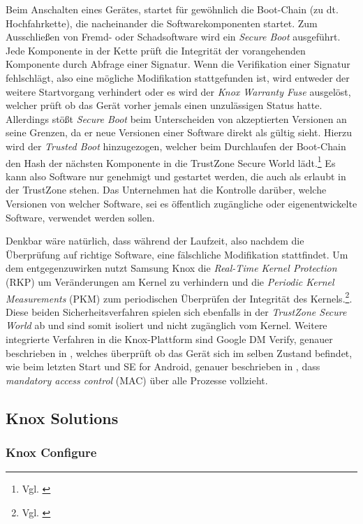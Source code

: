 Beim Anschalten eines Gerätes, startet für gewöhnlich die Boot-Chain (zu dt. Hochfahrkette), die nacheinander die Softwarekomponenten startet. Zum Ausschließen von Fremd- oder Schadsoftware wird ein \textit{Secure Boot} ausgeführt. Jede Komponente in der Kette prüft die Integrität der vorangehenden Komponente durch Abfrage einer Signatur. Wenn die Verifikation einer Signatur fehlschlägt, also eine mögliche Modifikation stattgefunden ist, wird entweder der weitere Startvorgang verhindert oder es wird der \textit{Knox Warranty Fuse} ausgelöst, welcher prüft ob das Gerät vorher jemals einen unzulässigen Status hatte. Allerdings stößt \textit{Secure Boot} beim Unterscheiden von akzeptierten Versionen an seine Grenzen, da er neue Versionen einer Software direkt als gültig sieht. Hierzu wird der \textit{Trusted Boot} hinzugezogen, welcher beim Durchlaufen der Boot-Chain den Hash der nächsten Komponente in die TrustZone Secure World lädt.\footnote{Vgl. \cite{sam2017d} } Es kann also Software nur genehmigt und gestartet werden, die auch als erlaubt in der TrustZone stehen. Das Unternehmen hat die Kontrolle darüber, welche Versionen von welcher Software, sei es öffentlich zugängliche oder eigenentwickelte Software, verwendet werden sollen. 

Denkbar wäre natürlich, dass während der Laufzeit, also nachdem die Überprüfung auf richtige Software, eine fälschliche Modifikation stattfindet. Um dem entgegenzuwirken nutzt Samsung Knox die \textit{Real-Time Kernel Protection} (RKP) um Veränderungen am Kernel zu verhindern und die \textit{Periodic Kernel Measurements} (PKM) zum periodischen Überprüfen der Integrität des Kernels.\footnote{Vgl. \cite{sam2017d} }. Diese beiden Sicherheitsverfahren spielen sich ebenfalls in der \textit{TrustZone Secure World} ab und sind somit isoliert und nicht zugänglich vom Kernel.
Weitere integrierte Verfahren in die Knox-Plattform sind Google DM Verify, genauer beschrieben in \cite{Goo2017a}, welches überprüft ob das Gerät sich im selben Zustand befindet, wie beim letzten Start und SE for Android, genauer beschrieben in \cite{Goo2017b}, dass \textit{mandatory access control} (MAC) über alle Prozesse vollzieht.
\subsection{Knox Solutions}
\subsubsection{Knox Configure}

